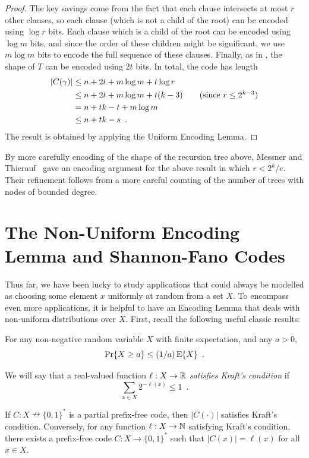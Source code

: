 \documentclass{patmorin}
\begin{document}
\begin{proof}
  The key savings come from the fact that each clause intersects at
  most $r$ other clauses, so each clause (which is not a child of the
  root) can be encoded using $\log r$ bits. Each clause which is a
  child of the root can be encoded using $\log m$ bits, and since the
  order of these children might be significant, we use $m \log m$ bits
  to encode the full sequence of these clauses. Finally, as in
  , the shape of $T$ can be encoded
  using $2t$ bits. In total, the code has length
  \begin{align*}
    |C(\gamma)| &\le n + 2t + m\log m+ t \log r \\
    &\le n + 2t + m\log m + t(k - 3) \tag{since $r \le 2^{k - 3}$} \\
    &= n + tk - t + m\log m \\
    &\le n + tk - s \enspace .
  \end{align*}
  The result is obtained by applying the Uniform Encoding Lemma.
\end{proof}

\begin{rem}
  By more carefully encoding of the shape of the recursion tree above,
  Messner and Thierauf~\cite{messner:ksat} gave an encoding argument
  for the above result in which $r < 2^k/e$. Their refinement follows
  from a more careful counting of the number of trees with nodes of
  bounded degree.
\end{rem}

\section{The Non-Uniform Encoding Lemma and Shannon-Fano Codes}

Thus far, we have been lucky to study applications that could always
be modelled as choosing some element $x$ uniformly at random from a
set $X$. To encompass even more applications, it is helpful to have an
Encoding Lemma that deals with non-uniform distributions over
$X$. First, recall the following useful classic results:
\begin{thm}
  For any non-negative random variable $X$ with finite expectation,
  and any $a > 0$,
  \[
    \Pr\{X \geq a\} \leq (1/a) \operatorname{\mathrm{E}}\{X\} \enspace .
  \]
\end{thm}

We will say that a real-valued function $\ell : X \to \mathbb{R}$
\emph{satisfies Kraft's condition} if
\[
  \sum_{x \in X} 2^{-\ell(x)} \leq 1 \enspace .
\]
\begin{lem}
  If $C : X \nrightarrow \{0,1\}^*$ is a partial prefix-free code,
  then $|C(\cdot)|$ satisfies Kraft's condition. Conversely, for any
  function $\ell : X \to \mathbb{N}$ satisfying Kraft's condition, there
  exists a prefix-free code $C : X \to \{0, 1\}^*$ such that
  $|C(x)| = \ell(x)$ for all $x \in X$.
\end{lem}
\end{document}
